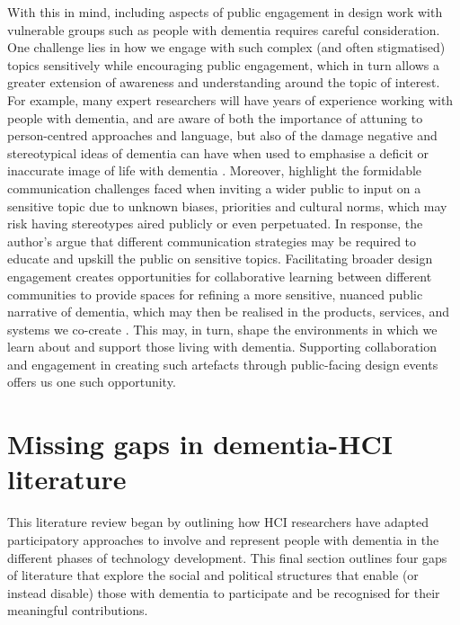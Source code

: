 With this in mind, including aspects of public engagement in design work with vulnerable groups such as people with dementia requires careful consideration. One challenge lies in how we engage with such complex (and often stigmatised) topics sensitively while encouraging public engagement, which in turn allows a greater extension of awareness and understanding around the topic of interest. For example, many expert researchers will have years of experience working with people with dementia, and are aware of both the importance of attuning to person-centred approaches \citep{fazio_fundamentals_2018} and language, but also of the damage negative and stereotypical ideas of dementia can have when used to emphasise a deficit or inaccurate image of life with dementia \citep{young_expanding_2019}. Moreover, \cite{niederdeppe2008message} highlight the formidable communication challenges faced when inviting a wider public to input on a sensitive topic due to unknown biases, priorities and cultural norms, which may risk having stereotypes aired publicly or even perpetuated. In response, the author's argue that different communication strategies may be required to educate and upskill the public on sensitive topics. Facilitating broader design engagement creates opportunities for collaborative learning between different communities to provide spaces for refining a more sensitive, nuanced public narrative of dementia, which may then be realised in the products, services, and systems we co-create \citep{costanza-chock_design_2020}. This may, in turn, shape the environments in which we learn about and support those living with dementia. Supporting collaboration and engagement in creating such artefacts through public-facing design events offers us one such opportunity. 

\section{Missing gaps in dementia-HCI literature}
\label{BL:Missing-gaps}
This literature review began by outlining how HCI researchers have adapted participatory approaches to involve and represent people with dementia in the different phases of technology development. This final section outlines four gaps of literature that explore the social and political structures that enable (or instead disable) those with dementia to participate and be recognised for their meaningful contributions. 


